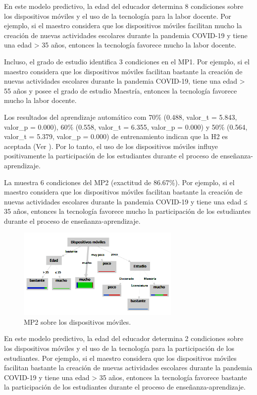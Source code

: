 \documentclass[spanish]{textolivre}
\begin{document}
En este modelo predictivo, la edad del educador determina 8 condiciones sobre los dispositivos móviles y el uso de la tecnología para la labor docente. Por ejemplo, si el  maestro considera que los dispositivos móviles facilitan mucho la creación de nuevas actividades escolares durante la pandemia COVID-19 y tiene una edad > 35 años, entonces la tecnología favorece mucho la labor docente.

Incluso, el grado de estudio identifica 3 condiciones en el MP1. Por ejemplo, si el  maestro considera que los dispositivos móviles facilitan bastante la creación de nuevas actividades escolares durante la pandemia COVID-19, tiene una edad > 55 años y posee el grado de estudio Maestría, entonces la tecnología favorece mucho la labor docente.

Los resultados del aprendizaje automático com 70\% (0.488, valor\_t = 5.843, valor\_p = 0.000), 60\% (0.558, valor\_t = 6.355, valor\_p = 0.000) y 50\% (0.564, valor\_t = 5.379, valor\_p = 0.000) de entrenamiento indican que la H2 es aceptada (Ver ). Por lo tanto, el uso de los dispositivos móviles influye positivamente la participación de los estudiantes durante el proceso de enseñanza-aprendizaje.

La  muestra 6 condiciones del MP2 (exactitud de 86.67\%). Por ejemplo, si el maestro considera que los dispositivos móviles facilitan bastante la creación de nuevas actividades escolares durante la pandemia COVID-19 y tiene una edad ≤ 35 años, entonces la tecnología favorece mucho la participación de los estudiantes durante el proceso de enseñanza-aprendizaje.

\begin{figure}[htbp]
 \centering
 \includegraphics[width=0.7\textwidth]{37074-pag4.png}
 \caption{MP2 sobre los dispositivos móviles.}
 \label{fig4}
\end{figure}

En este modelo predictivo, la edad del educador determina 2 condiciones sobre los dispositivos móviles y el uso de la tecnología para la participación de los estudiantes. Por ejemplo, si el maestro considera que los dispositivos móviles facilitan bastante la creación de nuevas actividades escolares durante la pandemia COVID-19 y tiene una edad > 35 años, entonces la tecnología favorece bastante la participación de los estudiantes durante el proceso de enseñanza-aprendizaje.
\end{document}
